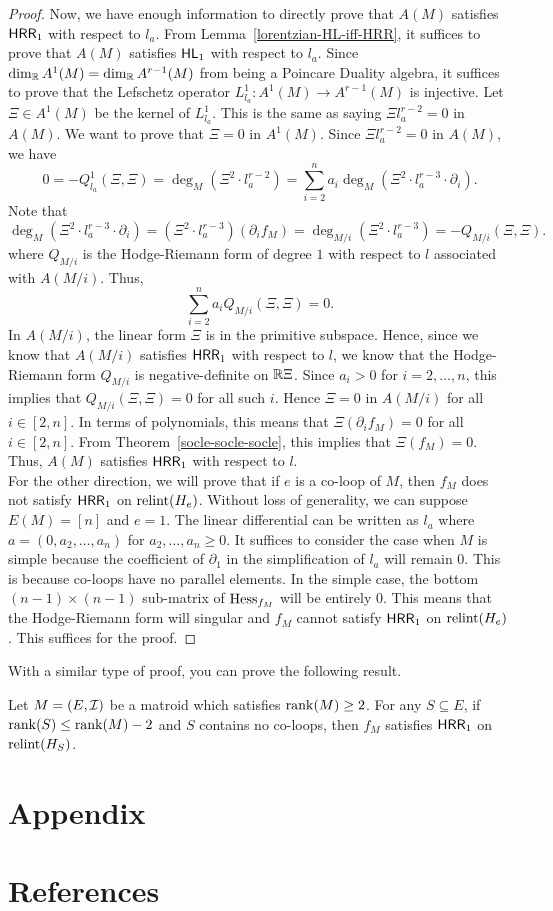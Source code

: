 \documentclass{puthesis-UG}
\begin{document}
\begin{proof}
	Now, we have enough information to directly prove that $A(M)$ satisfies $\mathsf{HRR}_1$ with respect to $l_a$. From Lemma~\ref{lorentzian-HL-iff-HRR}, it suffices to prove that $A(M)$ satisfies $\mathsf{HL}_1$ with respect to $l_a$. Since $\dim_{\mathbb{R}} A^1(M) = \dim_{\mathbb{R}} A^{r-1}(M)$ from being a Poincare Duality algebra, it suffices to prove that the Lefschetz operator $L_{l_a}^1 : A^1(M) \to A^{r-1}(M)$ is injective. Let $\Xi \in A^1(M)$ be the kernel of $L_{l_a}^1$. This is the same as saying $\Xi l_a^{r-2} = 0$ in $A(M)$. We want to prove that $\Xi = 0$ in $A^1(M)$. Since $\Xi l_a^{r-2} = 0$ in $A(M)$, we have 
	\[
		0 = -Q_{l_a}^1 (\Xi, \Xi) = \deg_M (\Xi^2 \cdot l_a^{r-2}) = \sum_{i = 2}^n a_i \deg_M (\Xi^2 \cdot l_a^{r-3} \cdot \partial_i).
	\]
	Note that 
	\[
		\deg_M (\Xi^2 \cdot l_a^{r-3} \cdot \partial_i) = (\Xi^2 \cdot l_a^{r-3}) (\partial_i f_M) = \deg_{M / i} (\Xi^2 \cdot l_a^{r-3}) = - Q_{M/i} (\Xi, \Xi).
	\]
	where $Q_{M/i}$ is the Hodge-Riemann form of degree $1$ with respect to $l$ associated with $A(M/i)$. Thus, 
	\[
		\sum_{i = 2}^n a_i Q_{M/i}(\Xi, \Xi) = 0.
	\]
	In $A(M/i)$, the linear form $\Xi$ is in the primitive subspace. Hence, since we know that $A(M/i)$ satisfies $\mathsf{HRR}_1$ with respect to $l$, we know that the Hodge-Riemann form $Q_{M/i}$ is negative-definite on $\mathbb{R} \Xi$. Since $a_i > 0$ for $i = 2, \ldots, n$, this implies that $Q_{M/i}(\Xi, \Xi) = 0$ for all such $i$. Hence $\Xi = 0$ in $A(M/i)$ for all $i \in [2, n]$. In terms of polynomials, this means that $\Xi (\partial_i f_M) = 0$ for all $i \in [2, n]$. From Theorem~\ref{socle-socle-socle}, this implies that $\Xi (f_M) = 0$. Thus, $A(M)$ satisfies $\mathsf{HRR}_1$ with respect to $l$. \\

	For the other direction, we will prove that if $e$ is a co-loop of $M$, then $f_M$ does not satisfy $\mathsf{HRR}_1$ on $\operatorname{relint} (H_e)$. Without loss of generality, we can suppose $E(M) = [n]$ and $e = 1$. The linear differential can be written as $l_a$ where $a = (0, a_2, \ldots, a_n)$ for $a_2, \ldots, a_n \geq 0$. It suffices to consider the case when $M$ is simple because the coefficient of $\partial_1$ in the simplification of $l_a$ will remain $0$. This is because co-loops have no parallel elements. In the simple case, the bottom $(n-1) \times (n-1)$ sub-matrix of $\operatorname{Hess}_{f_M}$ will be entirely $0$. This means that the Hodge-Riemann form will singular and $f_M$ cannot satisfy $\mathsf{HRR}_1$ on $\operatorname{relint} (H_e)$. This suffices for the proof. 
\end{proof}

With a similar type of proof, you can prove the following result. 
\begin{thm}
	Let $M = (E, \mathcal{I})$ be a matroid which satisfies $\operatorname{rank} (M) \geq 2$. For any $S \subseteq E$, if $\operatorname{rank}(S) \leq \operatorname{rank} (M) - 2$ and $S$ contains no co-loops, then $f_M$ satisfies $\mathsf{HRR}_1$ on $\operatorname{relint} (H_S)$. 
\end{thm}
\chapter{Appendix}

\chapter{References}


\end{document}
